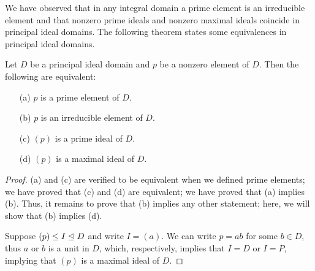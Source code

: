 We have observed that in any integral domain a prime element is an irreducible element and that nonzero prime ideals and nonzero maximal ideals coincide in principal ideal domains.
The following theorem states some equivalences in principal ideal domains.
\begin{thm}
    Let $D$ be a principal ideal domain and $p$ be a nonzero element of $D$.
    Then the following are equivalent:
    \begin{enumerate}
        \item[(a)]
        {
            $p$ is a prime element of $D$.
        }
        \item[(b)]
        {
            $p$ is an irreducible element of $D$.
        }
        \item[(c)]
        {
            $(p)$ is a prime ideal of $D$.
        }
        \item[(d)]
        {
            $(p)$ is a maximal ideal of $D$.
        }
    \end{enumerate}
\end{thm}
\begin{proof}
    (a) and (c) are verified to be equivalent when we defined prime elements; we have proved that (c) and (d) are equivalent; we have proved that (a) implies (b).
    Thus, it remains to prove that (b) implies any other statement; here, we will show that (b) implies (d).

    Suppose $(p)\leq I\trianglelefteq D$ and write $I=(a)$.
    We can write $p=ab$ for some $b\in D$, thus $a$ or $b$ is a unit in $D$, which, respectively, implies that $I=D$ or $I=P$, implying that $(p)$ is a maximal ideal of $D$.
\end{proof}
